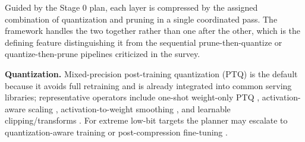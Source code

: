 \documentclass[
11pt, %
english, %
singlespacing, %
headsepline, %
]{MastersDoctoralThesis} %
\begin{document}
Guided by the Stage 0 plan, each layer is compressed by the assigned combination of quantization and pruning in a single coordinated pass. The framework handles the two together rather than one after the other, which is the defining feature distinguishing it from the sequential prune-then-quantize or quantize-then-prune pipelines criticized in the survey.

\textbf{Quantization.} Mixed-precision post-training quantization (PTQ) is the default because it avoids full retraining and is already integrated into common serving libraries; representative operators include one-shot weight-only PTQ \cite{frantar2023gptq}, activation-aware scaling \cite{lin2024awq}, activation-to-weight smoothing \cite{xiao2023smoothquant}, and learnable clipping/transforms \cite{shao2024omniquant}. For extreme low-bit targets the planner may escalate to quantization-aware training \cite{chen2025efficientqat} or post-compression fine-tuning \cite{malinovskii2024pvtuning}.
\end{document}
